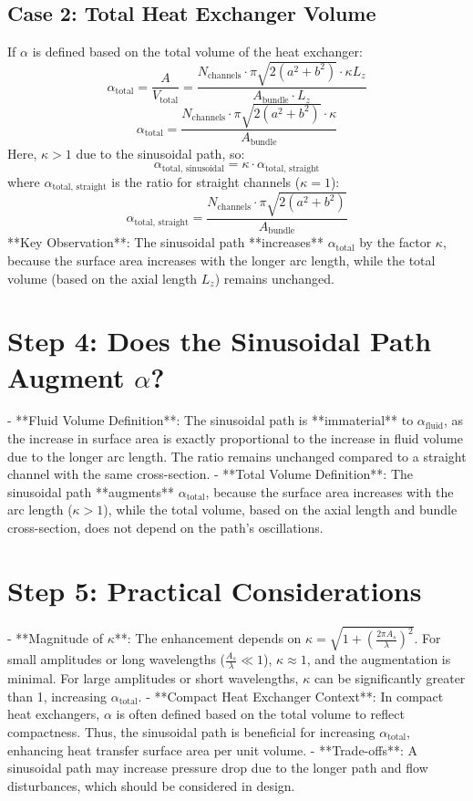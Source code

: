 \documentclass[]{article}
\begin{document}
\subsection{Case 2: Total Heat Exchanger Volume}
If \(\alpha\) is defined based on the total volume of the heat exchanger:
\[
\alpha_{\text{total}} = \frac{A}{V_{\text{total}}} = \frac{N_{\text{channels}} \cdot \pi \sqrt{2(a^2 + b^2)} \cdot \kappa L_z}{A_{\text{bundle}} \cdot L_z}
\]
\[
\alpha_{\text{total}} = \frac{N_{\text{channels}} \cdot \pi \sqrt{2(a^2 + b^2)} \cdot \kappa}{A_{\text{bundle}}}
\]
Here, \(\kappa > 1\) due to the sinusoidal path, so:
\[
\alpha_{\text{total, sinusoidal}} = \kappa \cdot \alpha_{\text{total, straight}}
\]
where \(\alpha_{\text{total, straight}}\) is the ratio for straight channels (\(\kappa = 1\)):
\[
\alpha_{\text{total, straight}} = \frac{N_{\text{channels}} \cdot \pi \sqrt{2(a^2 + b^2)}}{A_{\text{bundle}}}
\]
**Key Observation**: The sinusoidal path **increases** \(\alpha_{\text{total}}\) by the factor \(\kappa\), because the surface area increases with the longer arc length, while the total volume (based on the axial length \(L_z\)) remains unchanged.

\section{Step 4: Does the Sinusoidal Path Augment \(\alpha\)?}
- **Fluid Volume Definition**: The sinusoidal path is **immaterial** to \(\alpha_{\text{fluid}}\), as the increase in surface area is exactly proportional to the increase in fluid volume due to the longer arc length. The ratio remains unchanged compared to a straight channel with the same cross-section.
- **Total Volume Definition**: The sinusoidal path **augments** \(\alpha_{\text{total}}\), because the surface area increases with the arc length (\(\kappa > 1\)), while the total volume, based on the axial length and bundle cross-section, does not depend on the path’s oscillations.

\section{Step 5: Practical Considerations}
- **Magnitude of \(\kappa\)**: The enhancement depends on \(\kappa = \sqrt{1 + \left(\frac{2\pi A_s}{\lambda}\right)^2}\). For small amplitudes or long wavelengths (\(\frac{A_s}{\lambda} \ll 1\)), \(\kappa \approx 1\), and the augmentation is minimal. For large amplitudes or short wavelengths, \(\kappa\) can be significantly greater than 1, increasing \(\alpha_{\text{total}}\).
- **Compact Heat Exchanger Context**: In compact heat exchangers, \(\alpha\) is often defined based on the total volume to reflect compactness. Thus, the sinusoidal path is beneficial for increasing \(\alpha_{\text{total}}\), enhancing heat transfer surface area per unit volume.
- **Trade-offs**: A sinusoidal path may increase pressure drop due to the longer path and flow disturbances, which should be considered in design.
\end{document}
